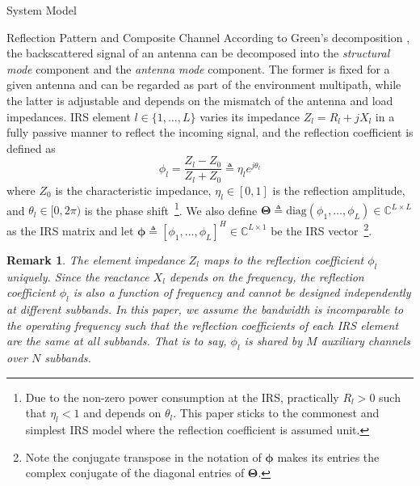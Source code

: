\documentclass[journal]{IEEEtran}
\newtheorem{remark}{Remark}
\begin{document}
\begin{section}{System Model}
		\begin{subsection}{Reflection Pattern and Composite Channel}
			According to Green's decomposition \cite{Hansen1989}, the backscattered signal of an antenna can be decomposed into the \emph{structural mode} component and the \emph{antenna mode} component. The former is fixed for a given antenna and can be regarded as part of the environment multipath, while the latter is adjustable and depends on the mismatch of the antenna and load impedances. IRS element $l \in \{1, \dots, L\}$ varies its impedance $Z_l = R_l + j X_l$ in a fully passive manner to reflect the incoming signal, and the reflection coefficient is defined as
			\begin{equation}
				\phi_l = \frac{Z_l - Z_0}{Z_l + Z_0} \triangleq \eta_l e^{j\theta_l}
			\end{equation}
			where $Z_0$ is the characteristic impedance, $\eta_l \in [0, 1]$ is the reflection amplitude, and $\theta_l \in [0,2\pi)$ is the phase shift~\footnote{Due to the non-zero power consumption at the IRS, practically $R_l > 0$ such that $\eta_l < 1$ and depends on $\theta_l$. This paper sticks to the commonest and simplest IRS model where the reflection coefficient is assumed unit.}. We also define $\boldsymbol{\Theta} \triangleq \mathrm{diag}(\phi_1, \dots, \phi_L) \in \mathbb{C}^{L \times L}$ as the IRS matrix and let $\boldsymbol{\phi} \triangleq [\phi_1, \dots, \phi_L]^H \in \mathbb{C}^{L \times 1}$ be the IRS vector~\footnote{Note the conjugate transpose in the notation of $\boldsymbol{\phi}$ makes its entries the complex conjugate of the diagonal entries of $\boldsymbol{\Theta}$.}.

			\begin{remark}\label{re:reflection_coefficient}
				The element impedance $Z_l$ maps to the reflection coefficient $\phi_l$ uniquely. Since the reactance $X_l$ depends on the frequency, the reflection coefficient $\phi_l$ is also a function of frequency and cannot be designed independently at different subbands. In this paper, we assume the bandwidth is incomparable to the operating frequency such that the reflection coefficients of each IRS element are the same at all subbands. That is to say, $\phi_l$ is shared by $M$ auxiliary channels over $N$ subbands.
			\end{remark}


\end{subsection}
\end{section}
\end{document}
